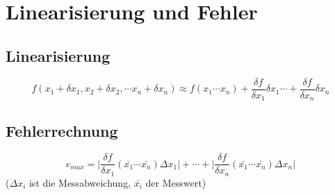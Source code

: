 \section{Linearisierung und Fehler}

\subsection{Linearisierung}
\begin{equation*}
	f(x_1 + \delta x_1, x_2 + \delta x_2, \cdots x_n + \delta x_n) \approx f(x_1 \cdots x_n) + \frac{\delta f}{\delta x_1} \delta x_1 \cdots + \frac{\delta f}{\delta x_n} \delta x_n
\end{equation*}

\subsection{Fehlerrechnung}
\begin{equation*}
	e_{max} = \bigg | \frac{\delta f}{\delta x_1}(\bar{x_1} \cdots \bar{x_n}) \Delta x_1 \bigg | + \cdots + \bigg | \frac{\delta f}{\delta x_n}(\bar{x_1} \cdots \bar{x_n}) \Delta x_n \bigg |
\end{equation*}
($\Delta x_i$ ist die Messabweichung, $\bar{x_i}$ der Messwert)